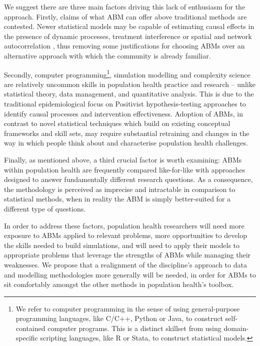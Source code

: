 \documentclass[review]{elsarticle}
\begin{document}
We suggest there are three main factors driving this lack of enthusiasm for the approach. Firstly, claims of what ABM can offer above traditional methods are contested. Newer statistical models may be capable of estimating causal effects in the presence of dynamic processes, treatment interference or spatial and network autocorrelation \citep{naimi2016}, thus removing some justifications for choosing ABMs over an alternative approach with which the community is already familiar. 

Secondly, computer programming\footnote{We refer to computer programming in the sense of using general-purpose programming languages, like C/C++, Python or Java, to construct self-contained computer programs.  This is a distinct skillset from using domain-specific scripting languages, like R or Stata, to construct statistical models.}, simulation modelling and complexity science are relatively uncommon skills in population health practice and research -- unlike  statistical theory, data management, and quantitative analysis.  This is due to the traditional epidemiological focus on Positivist hypothesis-testing approaches to identify causal processes and intervention effectiveness.  Adoption of ABMs, in contrast to novel statistical techniques which build on existing conceptual frameworks and skill sets, may require substantial retraining and changes in the way in which people think about and characterise population health challenges.

Finally, as mentioned above, a third crucial factor is worth examining: ABMs within population health are frequently compared like-for-like with approaches designed to answer fundamentally different research questions. As a consequence, the methodology is perceived as imprecise and intractable in comparison to statistical methods, when in reality the ABM is simply better-suited for a different type of questions.

In order to address these factors, population health researchers will need more exposure to ABMs applied to relevant problems, more opportunities to develop the skills needed to build simulations, and will need to apply their models to appropriate problems that leverage the strengths of ABMs while managing their weaknesses.  We propose that a realignment of the discipline's approach to data and modelling methodologies more generally will be needed, in order for ABMs to sit comfortably amongst the other methods in population health's toolbox.   

\end{document}
